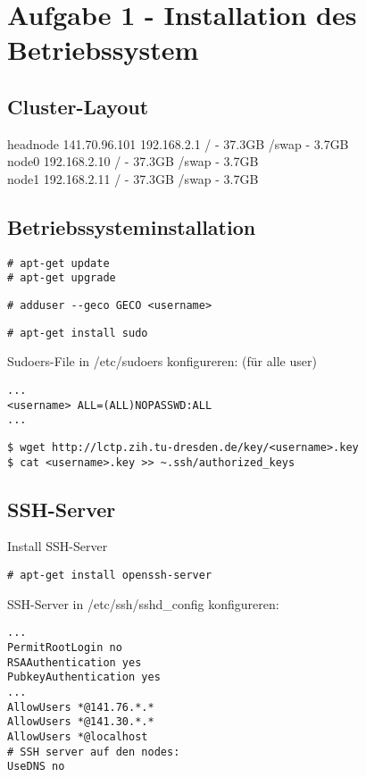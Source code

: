 \chapter{Aufgabe 1 - Installation des Betriebssystem}
\section{Cluster-Layout}
headnode
141.70.96.101
192.168.2.1
/ - 37.3GB
/swap - 3.7GB
\\
node0
192.168.2.10
/ - 37.3GB
/swap - 3.7GB
\\
node1
192.168.2.11
/ - 37.3GB
/swap - 3.7GB

\section{Betriebssysteminstallation}
\begin{lstlisting}[style=Bash]
# apt-get update 
# apt-get upgrade 
\end{lstlisting}
\begin{lstlisting}[style=Bash]
# adduser --geco GECO <username>
\end{lstlisting}
\begin{lstlisting}[style=Bash]
# apt-get install sudo
\end{lstlisting}
Sudoers-File in /etc/sudoers konfigureren:
(für alle user)
\begin{lstlisting}[style=Bash]
...
<username> ALL=(ALL)NOPASSWD:ALL
...
\end{lstlisting}
\begin{lstlisting}[style=Bash]
$ wget http://lctp.zih.tu-dresden.de/key/<username>.key
$ cat <username>.key >> ~.ssh/authorized_keys
\end{lstlisting}


\section{SSH-Server}
Install SSH-Server
\begin{lstlisting}[style=Bash]
# apt-get install openssh-server 
\end{lstlisting}

SSH-Server in /etc/ssh/sshd\_config konfigureren:
\begin{lstlisting}[style=Bash]
...
PermitRootLogin no
RSAAuthentication yes
PubkeyAuthentication yes
...
AllowUsers *@141.76.*.*
AllowUsers *@141.30.*.*
AllowUsers *@localhost
# SSH server auf den nodes:
UseDNS no
\end{lstlisting}

